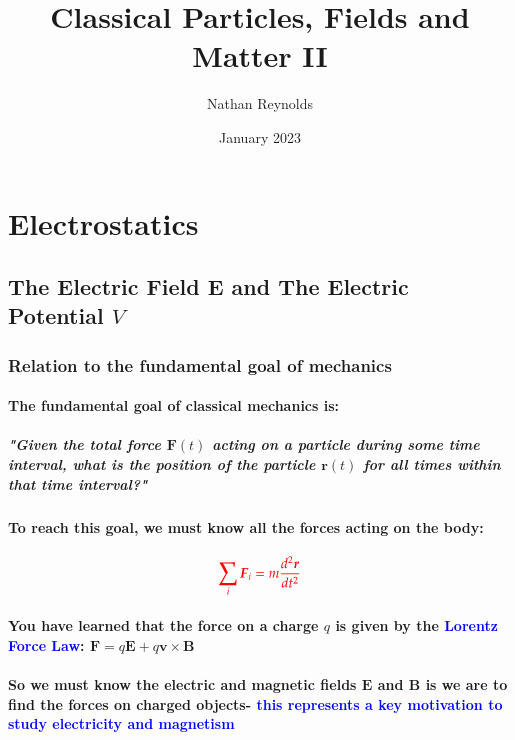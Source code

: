 \documentclass{article}
\title{Classical Particles, Fields and Matter II}
\author{Nathan Reynolds}
\date{January 2023}
\begin{document}
\maketitle

\tableofcontents
\pagebreak
\chapter{\Huge{Electrostatics}}
\section{The Electric Field $\boldsymbol{E}$ and The Electric Potential $V$}
\subsection{Relation to the fundamental goal of mechanics}
\subsubsection{The fundamental goal of classical mechanics is:}
\paragraph{\indent "Given the total force $\boldsymbol{F}(t)$ acting on a particle during some time interval, what is the position of the particle $\boldsymbol{r}(t)$ for all times within that time interval?"}
\subsubsection{To reach this goal, we must know all the forces acting on the body:}
\begin{equation*}
    \textcolor{red}{\sum_{i}\boldsymbol{F}_i=m\frac{d^2\boldsymbol{r}}{dt^2}}
\end{equation*}
\subsubsection{You have learned that the force on a charge $q$ is given by the \textcolor{blue}{Lorentz Force Law}: $\boldsymbol{F}=q\boldsymbol{E}+q\boldsymbol{v\times B}$}
\subsubsection{So we must know the electric and magnetic fields $\boldsymbol{E}$ and $\boldsymbol{B}$ is we are to find the forces on charged objects- \textcolor{blue}{this represents a key motivation to study electricity and magnetism}}
\end{document}
